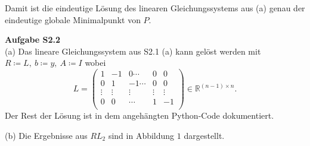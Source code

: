 \documentclass[ngerman, a4paper,12pt]{article}
\begin{document}
Damit ist die eindeutige Lösung des linearen Gleichungssystems aus (a) genau der eindeutige globale Minimalpunkt von $P$.
\par
\textbf{Aufgabe S2.2} \\
(a) Das lineare Gleichungssystem aus S2.1 (a) kann gelöst werden mit $R \coloneqq L, \ b \coloneqq y, \ A \coloneqq I$ wobei
\begin{equation*}
	L = \begin{pmatrix}
	1 &-1 & 0 \cdots &0 &0\\
	0 & 1 & -1 \cdots &0 &0\\
	\vdots & \vdots & \vdots & \vdots & \vdots \\
	0 & 0 & \cdots & 1 & -1\\ 
	\end{pmatrix} \in \mathbb R^{(n-1)\times n}.
\end{equation*}
Der Rest der Lösung ist in dem angehängten Python-Code dokumentiert.
\par
(b) Die Ergebnisse aus $RL_2$ sind in Abbildung $1$ dargestellt. 
\end{document}
